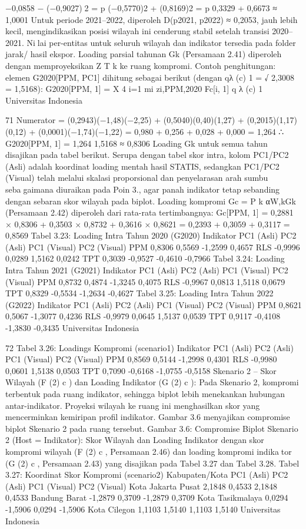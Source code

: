 −0,0858 − (−0,9027)2
=
p
(−0,5770)2 + (0,8169)2 =
p
0,3329 + 0,6673 ≈ 1,0001
Untuk periode 2021–2022, diperoleh D(p2021, p2022) ≈ 0,2053, jauh lebih kecil,
mengindikasikan posisi wilayah ini cenderung stabil setelah transisi 2020–2021. Nilai per-entitas untuk seluruh wilayah dan indikator tersedia pada folder jarak/ hasil
ekspor.
Loading parsial tahunan Gk (Persamaan 2.41) diperoleh dengan memproyeksikan Z
T
k
ke ruang kompromi. Contoh penghitungan: elemen G2020[PPM, PC1] dihitung sebagai
berikut (dengan qλ
(c)
1 =
√
2,3008 = 1,5168):
G2020[PPM, 1] =
X
4
i=1
mi zi,PPM,2020 Fc[i, 1]
q
λ
(c)
1
Universitas Indonesia

71
Numerator = (0,2943)(−1,48)(−2,25) + (0,5040)(0,40)(1,27)
+ (0,2015)(1,17)(0,12) + (0,0001)(−1,74)(−1,22)
= 0,980 + 0,256 + 0,028 + 0,000 = 1,264
∴ G2020[PPM, 1] = 1,264
1,5168
≈ 0,8306
Loading Gk untuk semua tahun disajikan pada tabel berikut. Serupa dengan tabel skor
intra, kolom PC1/PC2 (Asli) adalah koordinat loading mentah hasil STATIS, sedangkan
PC1/PC2 (Visual) telah melalui skalasi proporsional dan penyelarasan arah sumbu sebagaimana diuraikan pada Poin 3., agar panah indikator tetap sebanding dengan sebaran skor
wilayah pada biplot. Loading kompromi Gc =
P
k αW,kGk (Persamaan 2.42) diperoleh
dari rata-rata tertimbangnya:
Gc[PPM, 1] = 0,2881 × 0,8306 + 0,3503 × 0,8732 + 0,3616 × 0,8621
= 0,2393 + 0,3059 + 0,3117 = 0,8569
Tabel 3.23: Loading Intra Tahun 2020 (G2020)
Indikator PC1 (Asli) PC2 (Asli) PC1 (Visual) PC2 (Visual)
PPM 0,8306 0,5569 -1,2599 0,4657
RLS -0,9996 0,0289 1,5162 0,0242
TPT 0,3039 -0,9527 -0,4610 -0,7966
Tabel 3.24: Loading Intra Tahun 2021 (G2021)
Indikator PC1 (Asli) PC2 (Asli) PC1 (Visual) PC2 (Visual)
PPM 0,8732 0,4874 -1,3245 0,4075
RLS -0,9967 0,0813 1,5118 0,0679
TPT 0,8329 -0,5534 -1,2634 -0,4627
Tabel 3.25: Loading Intra Tahun 2022 (G2022)
Indikator PC1 (Asli) PC2 (Asli) PC1 (Visual) PC2 (Visual)
PPM 0,8621 0,5067 -1,3077 0,4236
RLS -0,9979 0,0645 1,5137 0,0539
TPT 0,9117 -0,4108 -1,3830 -0,3435
Universitas Indonesia

72
Tabel 3.26: Loadings Kompromi (scenario1)
Indikator PC1 (Asli) PC2 (Asli) PC1 (Visual) PC2 (Visual)
PPM 0,8569 0,5144 -1,2998 0,4301
RLS -0,9980 0,0601 1,5138 0,0503
TPT 0,7090 -0,6168 -1,0755 -0,5158
Skenario 2 – Skor Wilayah (F
(2)
c ) dan Loading Indikator (G
(2)
c ): Pada Skenario 2,
kompromi terbentuk pada ruang indikator, sehingga biplot lebih menekankan hubungan
antar-indikator. Proyeksi wilayah ke ruang ini menghasilkan skor yang mencerminkan
kemiripan profil indikator. Gambar 3.6 menyajikan compromise biplot Skenario 2 pada
ruang tersebut.
Gambar 3.6: Compromise Biplot Skenario 2 (Host = Indikator): Skor Wilayah dan
Loading Indikator
dengan skor kompromi wilayah (F
(2)
c , Persamaan 2.46) dan loading kompromi indikator (G
(2)
c , Persamaan 2.43) yang disajikan pada Tabel 3.27 dan Tabel 3.28.
Tabel 3.27: Koordinat Skor Kompromi (scenario2)
Kabupaten/Kota PC1 (Asli) PC2 (Asli) PC1 (Visual) PC2 (Visual)
Kota Jakarta Pusat 2,1848 0,4533 2,1848 0,4533
Bandung Barat -1,2879 0,3709 -1,2879 0,3709
Kota Tasikmalaya 0,0294 -1,5906 0,0294 -1,5906
Kota Cilegon 1,1103 1,5140 1,1103 1,5140
Universitas Indonesia

